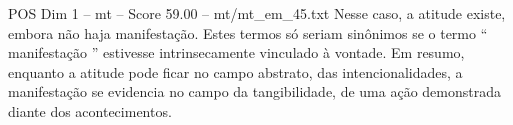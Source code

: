 \begin{textsample}{POS Dim 1 – mt – Score 59.00 – mt/mt\_em\_45.txt}
Nesse caso, a atitude existe, embora não haja manifestação.
Estes termos só seriam sinônimos se o termo “ manifestação ” estivesse intrinsecamente vinculado à vontade.
Em resumo, enquanto a atitude pode ficar no campo abstrato, das intencionalidades, a manifestação se evidencia no campo da tangibilidade, de uma ação demonstrada diante dos acontecimentos.

\end{textsample}
